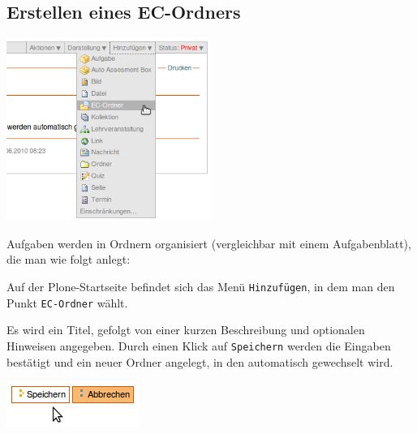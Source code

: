 \documentclass[a4paper]{scrartcl}
\newcommand{\anf}[1]{\glqq{}#1\grqq{}}
\begin{document}
	  \subsection{Erstellen eines EC-Ordners}
	    \begin{center}
	      \includegraphics[width=0.5\textwidth]{images/AddingECFolder.png}
	      \label{fig:addingECFolder}
      \end{center}
      Aufgaben werden in Ordnern organisiert (vergleichbar mit einem Aufgabenblatt), die man wie folgt anlegt:
      
      Auf der Plone-Startseite befindet sich das Menü \anf{\texttt{Hinzufügen}}, in dem man den Punkt \anf{\texttt{EC-Ordner}} wählt.
      
      Es wird ein Titel, gefolgt von einer kurzen Beschreibung und optionalen Hinweisen angegeben. Durch einen Klick auf \anf{\texttt{Speichern}} werden die Eingaben bestätigt und ein neuer Ordner angelegt, in den automatisch gewechselt wird.
      \begin{center}
	      \includegraphics[scale=0.5]{images/Save.png}
	      \label{fig:save}
      \end{center}
	  
\end{document}
